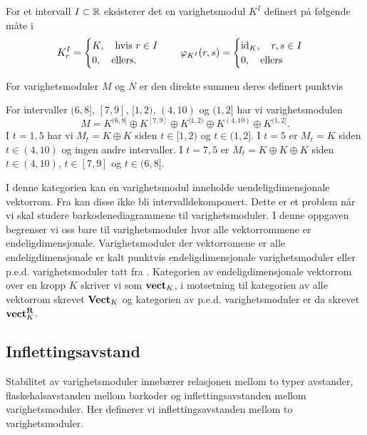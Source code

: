 \begin{eksempel}\label{eks:IntMod}
For et intervall $I\subset\mathbb{R}$ eksisterer det en varighetsmodul $K^I$ definert på følgende måte i \cite{Bauer2020}
\[
K^I_r =
\begin{cases}
K, \quad\text{hvis } r\in I\\
0, \quad\text{ellers.}
\end{cases}\quad 
\varphi_{K^I}(r,s) = 
\begin{cases}
\textnormal{id}_K,\quad r,s\in I\\
0,\quad \text{ellers}
\end{cases}
\]
\end{eksempel}

\begin{definisjon}\label{prop:VMDS}
  For varighetsmoduler $M$ og $N$ er den direkte summen
  deres definert punktvis
\end{definisjon}

\begin{eksempel}\label{eks:varighetsmodul}
  For intervaller $(6,8]$, $[7,9]$, $[1,2)$, $(4,10)$ og
  $(1,2]$ har vi varighetsmodulen 
  \[M = K^{(6,8]}\oplus
  K^{[7,9]}\oplus K^{[1,2)}\oplus K^{(4,10)}\oplus
  K^{(1,2]}.\]
  I $t = 1,5$ har vi $M_t = K\oplus K$ siden $t\in[1,2)$
  og $t\in (1,2]$. I $t=5$ er $M_t = K$ siden $t\in
  (4,10)$ og ingen andre intervaller. I $t=7,5$ er $M_t
  = K\oplus K\oplus K$ siden $t\in (4,10)$, $t\in [7,9]$
  og $t\in(6,8]$.
\end{eksempel}

I denne kategorien kan en varighetsmodul inneholde
uendeligdimensjonale vektorrom. Fra \citep[teorem
2.8]{Chazal2016} kan disse ikke bli
intervalldekomponert. Dette er et problem når vi skal
studere barkodenediagrammene til varighetsmoduler.
I denne oppgaven begrenser vi oss bare til
varighetsmoduler hvor alle vektorrommene er
endeligdimensjonale. Varighetsmoduler der vektorromene er alle
endeligdimensjonale er kalt punktvis endeligdimensjonale
varighetsmoduler eller p.e.d. varighetsmoduler tatt fra
\cite{Bauer2015}. Kategorien av endeligdimensjonale
vektorrom over en kropp $K$ skriver vi som $\textnormal{\textbf{vect}}_K$,
i motsetning til kategorien av alle vektorrom skrevet
$\textnormal{\textbf{Vect}}_K$ og kategorien av p.e.d. varighetsmoduler er da skrevet
$\textnormal{\textbf{vect}}_K^{\textnormal{\textbf{{R}}}}$.

\subsection{Inflettingsavstand}
Stabilitet av varighetsmoduler innebærer relasjonen mellom
to typer avstander, flaskehalsavstanden mellom barkoder
og inflettingsavstanden mellom varighetsmoduler. Her
definerer vi inflettingsavstanden mellom to
varighetsmoduler.

